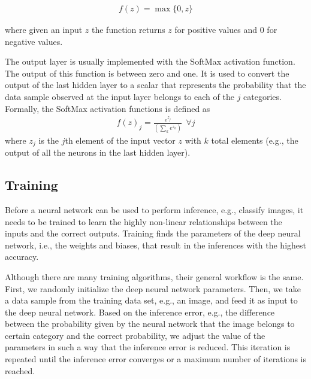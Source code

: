\documentclass[letterpaper]{article}
\begin{document}
\begin{flushleft}
{\begin{align}\label{eq:ReLU}
f(z) = \max\{0, z\}
\end{align}

where given an input $z$ the function returns $z$ for positive values and $0$ for negative values.

The output layer is usually implemented with the SoftMax activation function. The output of this function is between zero and one. It is used to convert the output of the last hidden layer to a scalar that represents the probability that the data sample observed at
the input layer belongs to each of the $j$ categories. Formally, the SoftMax activation functions is defined as
\begin{align}\label{eq:SoftMax}
f(z)_j = \frac{e^{z_j}} {(\sum_ke^{z_k})} \ \  \forall j
\end{align}
where $z_j$ is the $j$th element of the input vector $z$ with $k$ total elements (e.g., the output of all the neurons in the last hidden
layer).


\bigskip

\subsection{Training}
Before a neural network can be used to perform inference, e.g., classify images, it needs to be trained to learn the highly non-linear relationships between the inputs and the correct outputs. Training finds the
parameters of the deep neural network, i.e., the weights and biases, that result in the inferences with the highest accuracy.  

Although there are many training algorithms, their general workflow is the same. 
First, we randomly initialize the deep neural network parameters.
Then, we take a data sample from the training data set, e.g., an image, and feed it as input to the deep neural network. Based on the
inference error, e.g., the difference between the probability given by the neural network that the image belongs to certain category
and the correct probability, we adjust the value of the parameters in such a way that the inference error is reduced. This iteration is
repeated until the inference error converges or a maximum number of iterations is reached. 


}
\end{flushleft}
\end{document}
